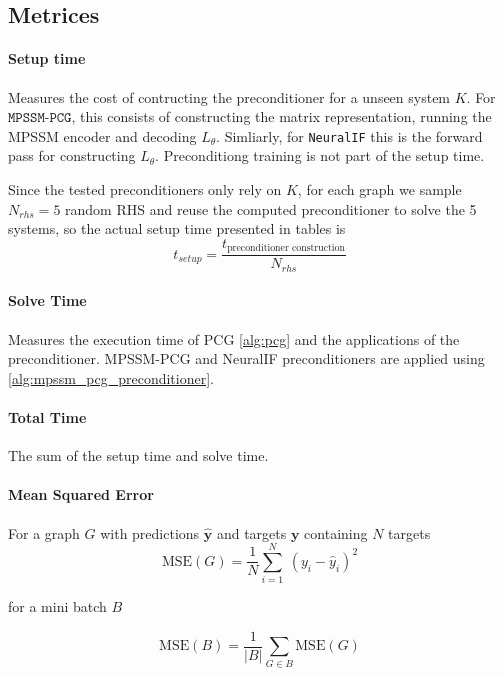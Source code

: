 \subsection{Metrices}
\paragraph{Setup time}\label{par:setup_time} Measures the cost
of contructing the preconditioner for a unseen system $K$. For
$\texttt{MPSSM-PCG}$, this consists of constructing the matrix representation,
running the MPSSM encoder and decoding $L_\theta$. Simliarly, for
\texttt{NeuralIF} this is the forward pass for constructing $L_\theta$.
Preconditiong training is not part of the setup time.

Since the tested preconditioners only rely on $K$, for each graph we sample $N_{rhs} = 5$ random RHS and reuse the computed
preconditioner to solve the 5 systems, so the actual setup time presented in tables is
\begin{equation}
    t_{setup} = \frac{t_{\text{preconditioner construction}}}{N_{rhs}}
\end{equation}

\paragraph{Solve Time}\label{par:solve_time} Measures the execution time of PCG
\ref{alg:pcg} and the applications of the preconditioner. MPSSM-PCG and NeuralIF
preconditioners are applied using \ref{alg:mpssm_pcg_preconditioner}.

\paragraph{Total Time}\label{par:total_time} The sum of the setup time and solve time.

\paragraph{Mean Squared Error} For a
graph $G$ with predictions $\mathbf{\hat y}$  and targets $\mathbf{y}$ containing $N$ targets
\begin{equation}\label{eq:mse}
    \text{MSE}(G) =  \frac{1}{N}\sum_{i = 1}^{N} \ (y_i - \hat y_i)^2
\end{equation}

for a mini batch $B$

\begin{equation}
    \text{MSE}(B) = \frac{1}{|B|}\sum_{G \in B} \text{MSE}(G)
\end{equation}

